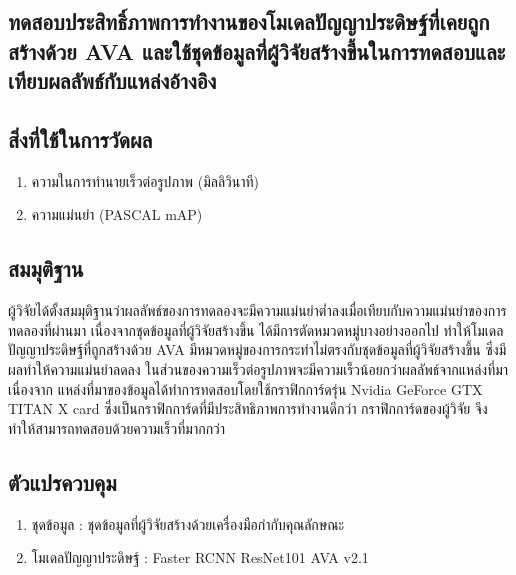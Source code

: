 \subsection{ทดสอบประสิทธิ์ภาพการทำงานของโมเดลปัญญาประดิษฐ์ที่เคยถูกสร้างด้วย AVA และใช้ชุดข้อมูลที่ผู้วิจัยสร้างขึ้นในการทดสอบและเทียบผลลัพธ์กับแหล่งอ้างอิง}
\subsection*{สิ่งที่ใช้ในการวัดผล}
	\begin{enumerate}
		\setlength\itemsep{-0.25em}
		\item ความในการทำนายเร็วต่อรูปภาพ (มิลลิวินาที)
		\item ความแม่นยำ (PASCAL mAP)
	\end{enumerate}
\subsection*{สมมุติฐาน}ผู้วิจัยได้ตั้งสมมุติฐานว่าผลลัพธ์ของการทดลองจะมีความแม่นยำต่ำลงเมื่อเทียบกับความแม่นยำของการทดลองที่ผ่านมา เนื่องจากชุดข้อมูลที่ผู้วิจัยสร้างขึ้น ได้มีการตัดหมวดหมู่บางอย่างออกไป 
ทำให้โมเดลปัญญาประดิษฐ์ที่ถูกสร้างด้วย AVA มีหมวดหมู่ของการกระทำไม่ตรงกับชุดข้อมูลที่ผู้วิจัยสร้างขึ้น ซึ่งมีผลทำให้ความแม่นยำลดลง ในส่วนของความเร็วต่อรูปภาพจะมีความเร็วน้อยกว่าผลลัพธ์จากแหล่งที่มา เนื่องจาก แหล่งที่มาของข้อมูลได้ทำการทดสอบโดยใช้กราฟิกการ์ดรุ่น Nvidia GeForce GTX TITAN X card ซึ่งเป็นกราฟิกการ์ดที่มีประสิทธิภาพการทำงานดีกว่า กราฟิกการ์ดของผู้วิจัย จึงทำให้สามารถทดสอบด้วยความเร็วที่มากกว่า
\subsection*{ตัวแปรควบคุม}
	\begin{enumerate}
		\setlength\itemsep{-0.25em}
		\item ชุดข้อมูล : ชุดข้อมูลที่ผู้วิจัยสร้างด้วยเครื่องมือกำกับคุณลักษณะ
		\item โมเดลปัญญาประดิษฐ์ : Faster RCNN ResNet101 AVA v2.1
	\end{enumerate}
